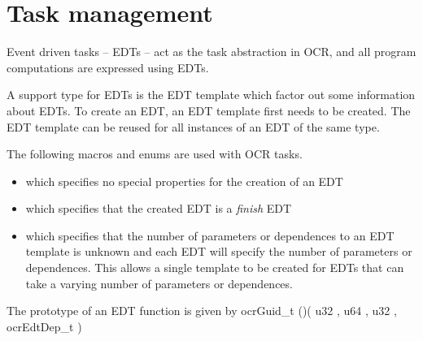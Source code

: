 \section{Task management}
\label{sec:OCRTaskManagement}

Event driven tasks -- EDTs -- act as the task abstraction in OCR, and all
program computations are expressed using E\-D\-Ts.

A support type for EDTs is the EDT template which factor out some information
about EDTs. To create an EDT, an EDT template first needs to be created. The EDT
template can be reused for all instances of an EDT of the same type.

The following macros and enums are used with OCR tasks.
\begin{itemize}
\item {} which specifies no special properties
  for the creation of an EDT
\item {} which specifies that the created EDT
  is a \emph{finish} EDT
\item {} which specifies that the number of
  parameters or dependences to an EDT template is unknown and each EDT will
  specify the number of parameters or dependences. This allows a single template
  to be created for EDTs that can take a varying number of parameters or dependences.
\end{itemize}

The prototype of an EDT function is given by
\hypertarget{type_ocrEdt_t}{
  \hypertarget{type_ocrGuid_t}{ocrGuid\_t} ()(
  \hypertarget{type_u32}{u32} , \hypertarget{type_u64}{u64} ,
  \hypertarget{type_u32}{u32} , \hypertarget{type_ocrEdtDep_t}
              {ocrEdtDep\_t} )}

